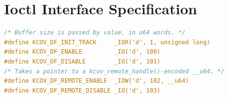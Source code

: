 \documentclass{article}
\begin{document}
\section{Ioctl Interface Specification}\label{app:ioctl}

\begin{lstlisting}[language=C,caption={Ioctl definitions}]
/* Buffer size is passed by value, in u64 words. */
#define KCOV_DF_INIT_TRACK     _IOR('d', 1, unsigned long)
#define KCOV_DF_ENABLE         _IO('d', 100)
#define KCOV_DF_DISABLE        _IO('d', 101)
/* Takes a pointer to a kcov_remote_handle()-encoded __u64. */
#define KCOV_DF_REMOTE_ENABLE  _IOW('d', 102, __u64)
#define KCOV_DF_REMOTE_DISABLE _IO('d', 103)
\end{lstlisting}
\end{document}
